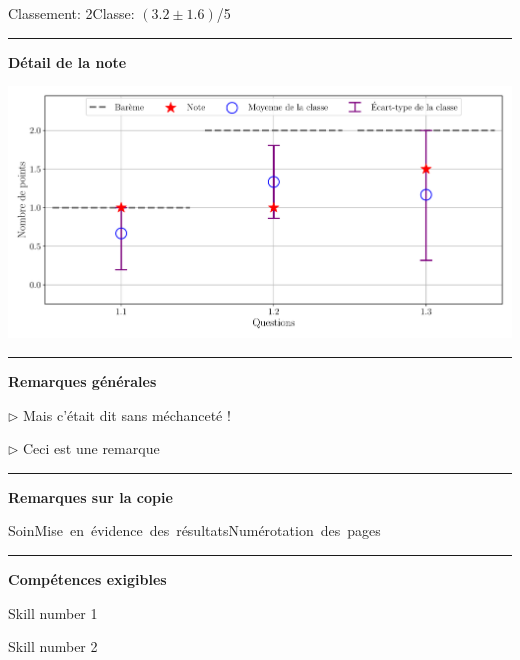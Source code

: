 \documentclass[12pt, a4paper]{article}
\begin{document}
\vspace*{-0.7cm}\noindent Classement: 2\hfill Classe:  $\left(3.2 \pm 1.6\right)$/5
\noindent\rule{\linewidth}{.7pt}\begin{center}{\large\bf Détail de la note}\end{center}

\begin{center}
\includegraphics[keepaspectratio, width=\linewidth]{./output/DU LAC_Lancelot_GradeStats.pdf}\end{center}


\noindent\rule{\linewidth}{.7pt}\begin{center}{\large\bf Remarques générales}\end{center}

$\triangleright$\xspace Mais c’était dit sans méchanceté !

$\triangleright$\xspace Ceci est une remarque


\noindent\rule{\linewidth}{.7pt}\begin{center}{\large\bf Remarques sur la copie}\end{center}

\begin{center}
\noindent \mbox{Soin\xspace\xspace\color{DarkOrange}\faMehO\color{black}}\hfill \mbox{Mise en évidence des résultats\xspace\xspace\color{DarkGreen}\faSmileO\color{black}}\hfill \mbox{Numérotation des pages\xspace\xspace\color{DarkRed}\faFrownO\color{black}}\hfill 
\end{center}


\noindent\rule{\linewidth}{.7pt}\begin{center}{\large\bf Compétences exigibles}\end{center}

\begin{minipage}[c]{0.4\linewidth}\centering
Skill number 1\xspace\xspace\color{DarkOrange}\faMehO\color{black}
\end{minipage}\hfill
\begin{minipage}[c]{0.4\linewidth}\centering
Skill number 2\xspace\xspace\color{DarkRed}\faFrownO\color{black}
\end{minipage}
\newpage
\end{document}
